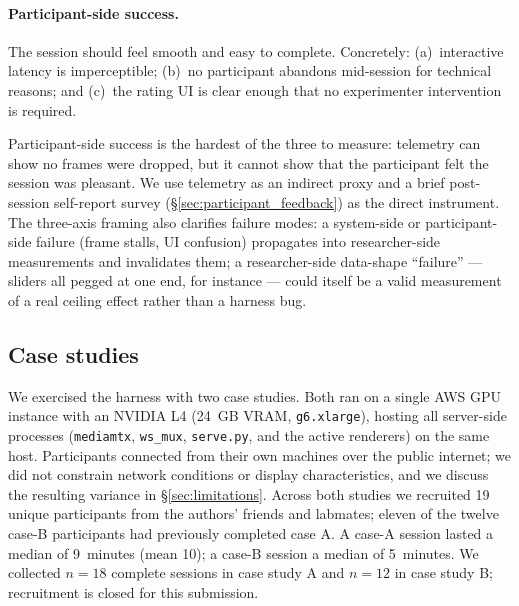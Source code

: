 \paragraph{Participant-side success.}
The session should feel smooth and easy to complete. Concretely:
(a)~interactive latency is imperceptible; (b)~no participant abandons
mid-session for technical reasons; and (c)~the rating UI is clear
enough that no experimenter intervention is required.

Participant-side success is the hardest of the three to measure:
telemetry can show no frames were dropped, but it cannot show that the
participant felt the session was pleasant. We use telemetry as an
indirect proxy and a brief post-session self-report survey
(\S\ref{sec:participant_feedback}) as the direct instrument. The
three-axis framing also clarifies failure modes: a system-side or
participant-side failure (frame stalls, UI confusion) propagates into
researcher-side measurements and invalidates them; a researcher-side
data-shape ``failure'' --- sliders all pegged at one end, for instance
--- could itself be a valid measurement of a real ceiling effect rather
than a harness bug.

\subsection{Case studies}
\label{sec:setup}

We exercised the harness with two case studies. Both ran on a single
AWS GPU instance with an NVIDIA L4 (24~GB VRAM, \texttt{g6.xlarge}),
hosting all server-side processes (\texttt{mediamtx}, \texttt{ws\_mux},
\texttt{serve.py}, and the active renderers) on the same host.
Participants connected from their own machines over the public
internet; we did not constrain network conditions or display
characteristics, and we discuss the resulting variance in
\S\ref{sec:limitations}. Across both studies we recruited 19 unique
participants from the authors' friends and labmates; eleven of the
twelve case-B participants had previously completed case A. A case-A session
lasted a median of 9~minutes (mean 10); a case-B session a median of
5~minutes. We collected $n=18$ complete sessions in case study A and
$n=12$ in case study B; recruitment is closed for this submission.

